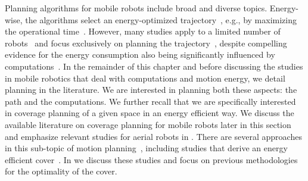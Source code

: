 Planning algorithms for mobile robots include broad and diverse topics. Energy-wise, the algorithms select an energy-optimized trajectory~\cite{mei2004energy}, e.g., by maximizing the operational time~\cite{wahab2015energy}. However, many studies apply to a limited number of robots~\cite{kim2005energy} and focus exclusively on planning the trajectory~\cite{kim2008minimum}, despite compelling evidence for the energy consumption also being significantly influenced by computations~\cite{mei2005case}. 
In the remainder of this chapter and before discussing the studies in mobile robotics that deal with computations and motion energy, we detail planning in the literature. 
We are interested in planning both these aspects: the path and the computations. We further recall that we are specifically interested in coverage planning of a given space in an energy efficient way. We discuss the available literature on coverage planning for mobile robots later in this section and emphasize relevant studies for aerial robots in . There are several approaches in this sub-topic of motion planning~\citep{choset2001coverage,cabreira2019survey}, including studies that derive an energy efficient cover~\citep{wei2018coverage,cabreira2018energy}. In  we discuss these studies and focus on previous methodologies for the optimality of the cover. 

